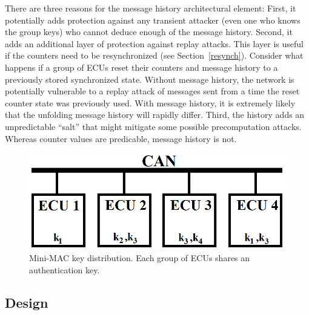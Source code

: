 There are three reasons for the message history architectural element:  
First, it potentially adds protection against any transient
attacker (even one who knows the group keys) who cannot deduce enough of the 
message history.  
Second, it adds an additional layer of protection against replay attacks.
This layer is useful if the counters need to be resynchronized (see Section~\ref{resynch}).
Consider what happens if a group of ECUs reset their counters and message history to
a previously stored synchronized state.  Without message history, the network
is potentially vulnerable to a replay attack of messages sent from a time 
the reset counter state was previously used.  With message history, it is extremely
likely that the unfolding message history will rapidly differ.
Third, the history adds an unpredictable ``salt'' that might mitigate some possible
precomputation attacks.  Whereas counter values are predicable, message history
is not.

	\begin{figure}
		\centering
		\includegraphics[width=\columnwidth]{figures/key_distribution.png}
		\caption{Mini-MAC key distribution.  Each group of ECUs shares an authentication key.}
		\label{fig-key}
	\end{figure}
	
\subsection{Design}
\label{design}

